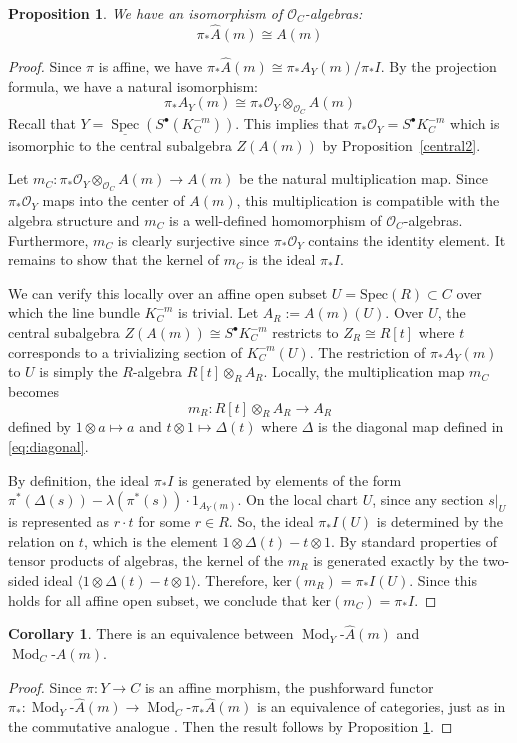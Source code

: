 \documentclass[11pt]{amsart}
\theoremstyle{plain}
\newtheorem{prop}[theorem]{Proposition}
\theoremstyle{definition}
\newtheorem{cor}[theorem]{Corollary}
\theoremstyle{remark}
\def\O{\mathcal{O}}
\def\Spec{\textrm{Spec}}
\def\ker{\textrm{ker}}
\def\wAm{\widehat{A}(m)}
\def\Mod{\operatorname{Mod}}
\begin{document}
\begin{prop}\label{prop:pushforward}
We have an isomorphism of $\O_C$-algebras:
\[\pi_*\wAm \cong A(m) \]
\end{prop}
\begin{proof}
    Since $\pi$ is affine, we have $\pi_*\wAm\cong \pi_*A_Y(m)/\pi_*I$. By the projection formula, we have a natural isomorphism: 
    \[\pi_*A_Y(m) \cong  \pi_*\O_Y\otimes_{\O_C} A(m) \]
    Recall that $Y= \underline{\operatorname{Spec}}(S^\bullet (K_C^{-m}))$. This implies that $\pi_*\O_Y = S^\bullet K_C^{-m}$ which is isomorphic to the central subalgebra $Z(A(m))$ by Proposition~\ref{central2}. 

    Let $m_C:\pi_*\O_Y\otimes_{\O_C}A(m)\to A(m)$ be the natural multiplication map. Since $\pi_*\O_Y$ maps into the center of $A(m)$, this multiplication is compatible with the algebra structure and $m_C$ is a well-defined homomorphism of $\O_C$-algebras. Furthermore, $m_C$ is clearly surjective since $ \pi_*\O_Y$ contains the identity element. It remains to show that the kernel of $m_C$ is the ideal $\pi_*I$.

    We can verify this locally over an affine open subset $U= \Spec(R)\subset C$ over which the line bundle $K_C^{-m}$ is trivial. Let $A_R:=A(m)(U)$. Over $U$, the central subalgebra $Z(A(m))\cong S^\bullet K_C^{-m}$ restricts to $Z_R\cong R[t]$ where $t$ corresponds to a trivializing section of $K_C^{-m}(U)$. The restriction of $\pi_*A_Y(m)$ to $U$ is simply the $R$-algebra $R[t]\otimes_R A_R$. Locally, the multiplication map $m_C$ becomes 
    \[m_R:R[t]\otimes _RA_R\to A_R \]
    defined by $1\otimes a\mapsto a$ and $t\otimes 1\mapsto \Delta(t)$ where $\Delta$ is the diagonal map defined in \ref{eq:diagonal}. 

    By definition, the ideal $\pi_*I$ is generated by elements of the form $\pi^*(\Delta(s)) -\lambda (\pi^*(s))\cdot 1_{A_Y(m)}$. On the local chart $U$, since any section $s|_U$ is represented as $r\cdot t$ for some $r\in R$. So, the ideal $\pi_*I(U)$ is determined by the relation on $t$, which is the element $1\otimes \Delta(t)-t\otimes 1$. By standard properties of tensor products of algebras, the kernel of the $m_R$ is generated exactly by the two-sided ideal $\langle 1\otimes \Delta(t)- t\otimes 1\rangle$. Therefore, $\ker(m_R)=\pi_*I(U)$. Since this holds for all affine open subset, we conclude that $\ker(m_C)=\pi_*I$. 
    
\end{proof}


\begin{cor}\label{cor:equiv2}
There is an equivalence between $\Mod_Y\!\text{-} \wAm$ and $\Mod_C\!\text{-}A(m)$. 
\end{cor}
\begin{proof} Since $\pi:Y\to C$ is an affine morphism, the pushforward functor $\pi_*: \Mod_Y\!\text{-} \wAm \to \Mod_C\!\text{-}\pi_*\wAm$ is an equivalence of categories, just as in the commutative analogue \cite[\href{https://stacks.math.columbia.edu/tag/01SB}{Tag 01SB}]{stacks-project}. Then the result follows by Proposition \ref{prop:pushforward}.  \end{proof}
\end{document}
